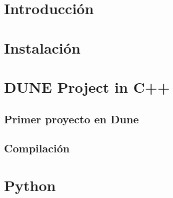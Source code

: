 \documentclass{scrarticle}
\begin{document}
\section{Introducción}

\section{Instalación}

\section{DUNE Project in C++}
\subsection[Primer Proyecto]{Primer proyecto en Dune}

\subsection{Compilación}

\newpage
\section{Python}
\end{document}
